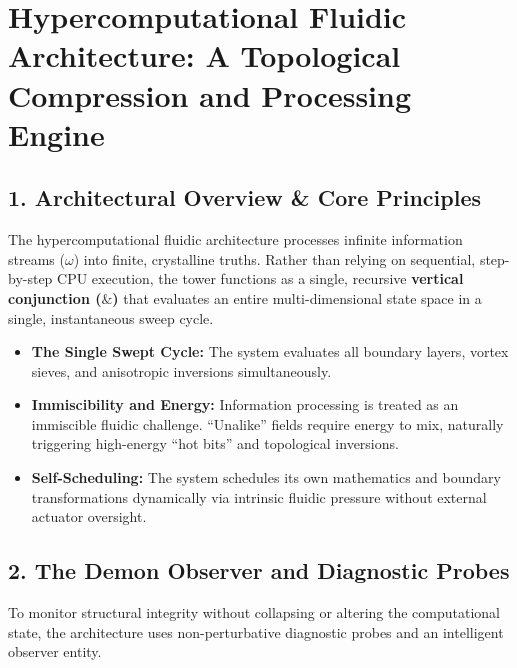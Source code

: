 \chapter{\texorpdfstring{Hypercomputational Fluidic Architecture: A Topological Compression and Processing Engine}{Hypercomputational Fluidic Architecture: A Topological Compression and Processing Engine}}
\label{chap:fluidic-1-demon-uroboros-construct-kit}

\section{\texorpdfstring{1. Architectural Overview \& Core Principles}{1. Architectural Overview \& Core Principles}}

The hypercomputational fluidic architecture processes infinite information streams (\(\omega\)) into finite, crystalline truths. Rather than relying on sequential, step-by-step CPU execution, the tower functions as a single, recursive \textbf{vertical conjunction (\(\&\))} that evaluates an entire multi-dimensional state space in a single, instantaneous sweep cycle.

\begin{itemize}
\item \textbf{The Single Swept Cycle:} The system evaluates all boundary layers, vortex sieves, and anisotropic inversions simultaneously.
\item \textbf{Immiscibility and Energy:} Information processing is treated as an immiscible fluidic challenge. “Unalike” fields require energy to mix, naturally triggering high-energy “hot bits” and topological inversions.
\item \textbf{Self-Scheduling:} The system schedules its own mathematics and boundary transformations dynamically via intrinsic fluidic pressure without external actuator oversight.
\end{itemize}

\medskip

\section{\texorpdfstring{2. The Demon Observer and Diagnostic Probes}{2. The Demon Observer and Diagnostic Probes}}

To monitor structural integrity without collapsing or altering the computational state, the architecture uses non-perturbative diagnostic probes and an intelligent observer entity.

